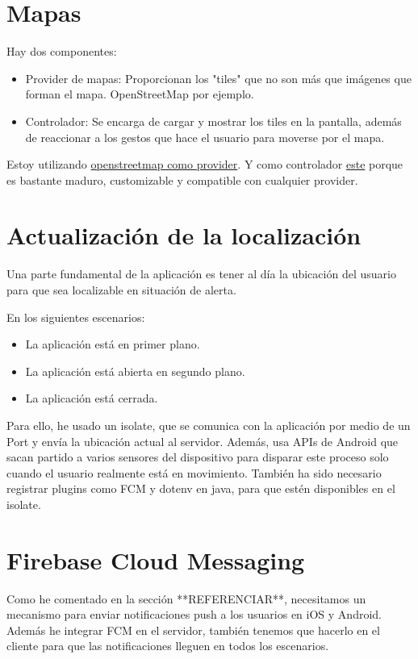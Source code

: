 \section{Mapas}

Hay dos componentes:
 \begin{itemize}
   \item Provider de mapas: Proporcionan los "tiles" que no son más que imágenes que forman el mapa. OpenStreetMap por ejemplo.
   \item Controlador: Se encarga de cargar y mostrar los tiles en la pantalla, además de reaccionar a los gestos que hace el usuario para moverse por el mapa. 
 \end{itemize}

 Estoy utilizando \href{https://wiki.openstreetmap.org/wiki/Tiles}{openstreetmap como provider}. Y como controlador \href{https://pub.dev/packages/map}{este} porque es bastante maduro, customizable y compatible con cualquier provider.

\section{Actualización de la localización}
Una parte fundamental de la aplicación es tener al día la ubicación del usuario para que sea localizable en situación de alerta.

En los siguientes escenarios:
\begin{itemize}
	\item La aplicación está en primer plano.
	\item La aplicación está abierta en segundo plano.
	\item La aplicación está cerrada.
\end{itemize}

Para ello, he usado un isolate, que se comunica con la aplicación por medio de un Port y envía la ubicación actual al servidor.
Además, usa APIs de Android que sacan partido a varios sensores del dispositivo para disparar este 
proceso solo cuando el usuario realmente está en movimiento.
También ha sido necesario registrar plugins como FCM y dotenv en java, para que estén disponibles en el isolate.

\section{Firebase Cloud Messaging}\label{sec:fib}
Como he comentado en la sección **REFERENCIAR**, necesitamos un mecanismo para enviar notificaciones push a los usuarios en iOS y Android.
Además he integrar FCM en el servidor, también tenemos que hacerlo en el cliente para que las notificaciones lleguen en todos los escenarios.


